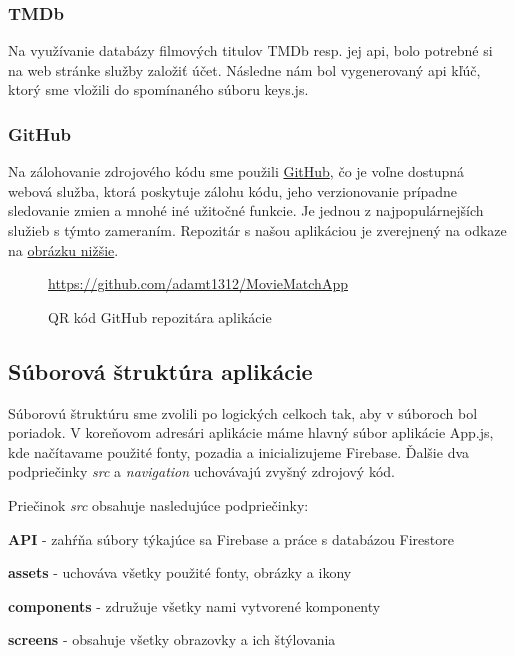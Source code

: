 \subsubsection{TMDb}
Na využívanie databázy filmových titulov TMDb resp. jej \acrshort{api}, bolo potrebné si na web stránke služby založiť účet. Následne nám bol vygenerovaný \acrshort{api} kľúč, ktorý sme vložili do spomínaného súboru keys.js. 
\subsubsection{GitHub}
Na zálohovanie zdrojového kódu sme použili \href{https://github.com/}{GitHub}, čo je voľne dostupná webová služba, ktorá poskytuje zálohu kódu, jeho verzionovanie prípadne sledovanie zmien a mnohé iné užitočné funkcie. Je jednou z najpopulárnejších služieb s týmto zameraním. Repozitár s našou aplikáciou je zverejnený na odkaze na \hyperref[ghqrcode]{obrázku nižšie}. 

\begin{figure}[hbt!]
  \centering   
  \def\stackalignment{c}
           {\scriptsize%
            \url{https://github.com/adamt1312/MovieMatchApp}}
	\caption{QR kód GitHub repozitára aplikácie}  
  \label{ghqrcode}
\end{figure}
\subsection{Súborová štruktúra aplikácie}
Súborovú štruktúru sme zvolili po logických celkoch tak, aby v súboroch bol poriadok. V koreňovom adresári aplikácie máme hlavný súbor aplikácie App.js, kde načítavame použité fonty, pozadia a inicializujeme Firebase. Ďalšie dva podpriečinky \textit{src} a \textit{navigation} uchovávajú zvyšný zdrojový kód. 

Priečinok \textit{src} obsahuje nasledujúce podpriečinky:
\begin{itemize}
{\item \textbf{API} - zahŕňa súbory týkajúce sa Firebase a práce s databázou Firestore} 
{\item \textbf{assets} - uchováva všetky použité fonty, obrázky a ikony} 
{\item \textbf{components} - združuje všetky nami vytvorené komponenty} 
{\item \textbf{screens} - obsahuje všetky obrazovky a ich štýlovania}
\end{itemize}

